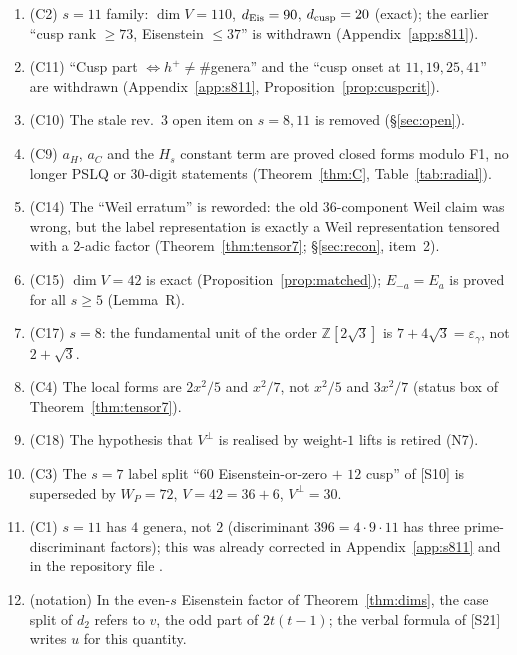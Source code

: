 \documentclass[11pt]{article}
\theoremstyle{definition}
\theoremstyle{plain}
\newcommand{\Z}{\mathbb{Z}}
\newcommand{\src}[1]{\textup{[S#1]}}
\begin{document}
\begin{enumerate}[label=\textbf{R4.\arabic*},leftmargin=3.2em]
\item (C2) $s=11$ family: $\dim V=110$, $d_{\rm Eis}=90$, $d_{\rm cusp}=20$ (exact); the earlier ``cusp rank $\ge73$, Eisenstein $\le37$'' is withdrawn (Appendix~\ref{app:s811}).
\item (C11) ``Cusp part $\Leftrightarrow h^+\neq\#$genera'' and the ``cusp onset at $11,19,25,41$'' are withdrawn (Appendix~\ref{app:s811}, Proposition~\ref{prop:cuspcrit}).
\item (C10) The stale rev.~3 open item on $s=8,11$ is removed (\S\ref{sec:open}).
\item (C9) $a_H$, $a_C$ and the $H_s$ constant term are proved closed forms modulo F1, no longer PSLQ or 30-digit statements (Theorem~\ref{thm:C}, Table~\ref{tab:radial}).
\item (C14) The ``Weil erratum'' is reworded: the old $36$-component Weil claim was wrong, but the label representation is exactly a Weil representation tensored with a
$2$-adic factor (Theorem~\ref{thm:tensor7}; \S\ref{sec:recon}, item~2).
\item (C15) $\dim V=42$ is exact (Proposition~\ref{prop:matched}); $E_{-a}=E_a$ is proved for all $s\ge5$ (Lemma~R).
\item (C17) $s=8$: the fundamental unit of the order $\Z[2\sqrt3]$ is $7+4\sqrt3=\varepsilon_\gamma$, not $2+\sqrt3$.
\item (C4) The local forms are $2x^2/5$ and $x^2/7$, not $x^2/5$ and $3x^2/7$ (status box of Theorem~\ref{thm:tensor7}).
\item (C18) The hypothesis that $V^\perp$ is realised by weight-$1$ lifts is retired (N7).
\item (C3) The $s=7$ label split ``$60$ Eisenstein-or-zero $+$ $12$ cusp'' of \src{10} is superseded by $W_P=72$, $V=42=36+6$, $V^\perp=30$.
\item (C1) $s=11$ has $4$ genera, not $2$ (discriminant $396=4\cdot9\cdot11$ has three prime-discriminant factors); this was already corrected in Appendix~\ref{app:s811} and in the repository file .
\item (notation) In the even-$s$ Eisenstein factor of Theorem~\ref{thm:dims}, the case split of $d_2$ refers to $v$, the odd part of $2t(t-1)$; the verbal formula of \src{21} writes $u$ for this quantity.
\end{enumerate}
\end{document}
